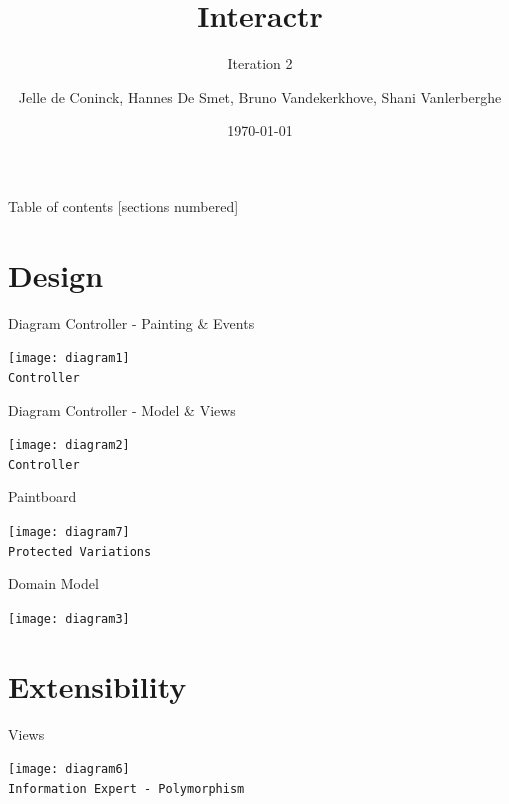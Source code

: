 \documentclass[10pt]{beamer}
\title{Interactr}
\subtitle{Iteration 2}
\date{\today}
\author{Jelle de Coninck, Hannes De Smet, Bruno Vandekerkhove, Shani Vanlerberghe}
\institute{KULeuven}
\begin{document}
\maketitle

\begin{frame}{Table of contents}
  [sections numbered]
  \tableofcontents[hideallsubsections]
\end{frame}

\section{Design}

\begin{frame}[fragile]{Diagram Controller - Painting \& Events}
\begin{center}
\texttt{[image: diagram1]}
\vspace{0.5cm}\\\texttt{Controller}
\end{center}
\end{frame}

\begin{frame}[fragile]{Diagram Controller - Model \& Views}
\begin{center}
\texttt{[image: diagram2]}
\vspace{0.5cm}\\\texttt{Controller}
\end{center}
\end{frame}

\begin{frame}[fragile]{Paintboard}
\begin{center}
\texttt{[image: diagram7]}
\vspace{0.5cm}\\\texttt{Protected Variations}
\end{center}
\end{frame}

\begin{frame}[fragile]{Domain Model}
	\begin{center}
	\texttt{[image: diagram3]}
	\end{center}
\end{frame}

\section{Extensibility}

\begin{frame}[fragile]{Views}
	\begin{center}
	\texttt{[image: diagram6]}
	\vspace{0.5cm}\\\texttt{Information Expert - Polymorphism}
	\end{center}
\end{frame}
\end{document}

